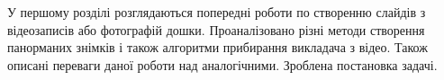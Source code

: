 У першому розділі розглядаються попередні роботи
по створенню слайдів з відеозаписів або фотографій дошки.
Проаналізовано різні методи створення панорманих знімків
і також алгоритми прибирання викладача з відео. Також 
описані переваги даної роботи над аналогічними. 
Зроблена постановка задачі.